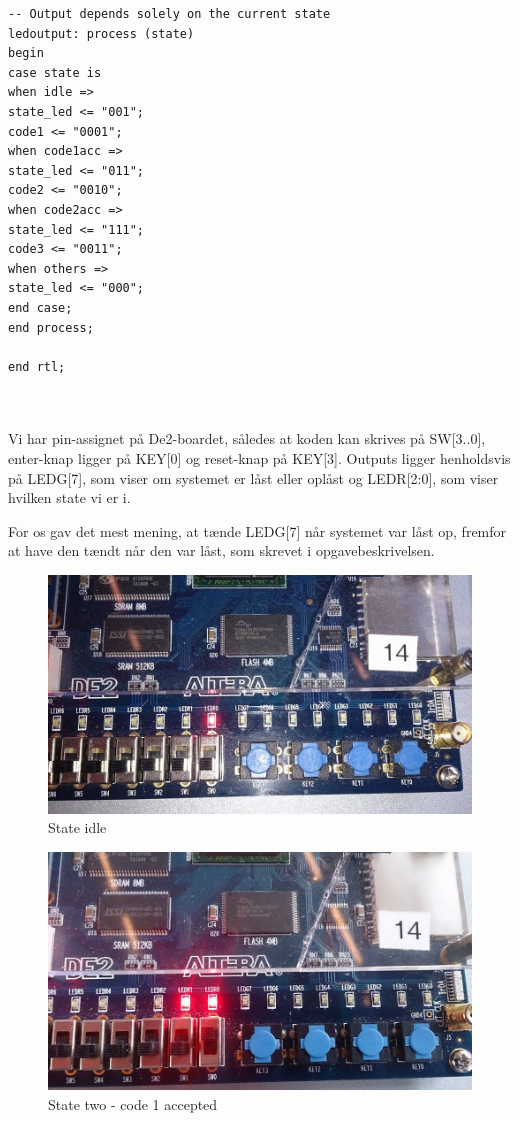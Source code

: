 \begin{enumerate}
\begin{lstlisting}[caption={VHDL koden for kodelås},label={lst:code_lock}]
-- Output depends solely on the current state
ledoutput: process (state)
begin
case state is
when idle =>
state_led <= "001";
code1 <= "0001";
when code1acc =>
state_led <= "011";
code2 <= "0010";
when code2acc =>
state_led <= "111";
code3 <= "0011";
when others =>
state_led <= "000";
end case;
end process;

end rtl;



\end{lstlisting}

Vi har pin-assignet på De2-boardet, således at koden kan skrives på SW[3..0], enter-knap ligger på KEY[0] og reset-knap på KEY[3]. Outputs ligger henholdsvis på LEDG[7], som viser om systemet er låst eller oplåst og LEDR[2:0], som viser hvilken state vi er i. 

For os gav det mest mening, at tænde LEDG[7] når systemet var låst op, fremfor at have den tændt når den var låst, som skrevet i opgavebeskrivelsen. 

\begin{figure}[h!]
	\centering
	\includegraphics[scale=0.34]{pictures/Oevelse7/opg2/StateIdle.JPG}
	\caption{State idle}
	\label{fig:}
\end{figure}
		
\begin{figure}[h!]
	\centering
	\includegraphics[scale=0.45, angle =270]{pictures/Oevelse7/opg2/StateTwo.JPG}
	\caption{State two - code 1 accepted}
	\label{fig:}
\end{figure}


\end{enumerate}
